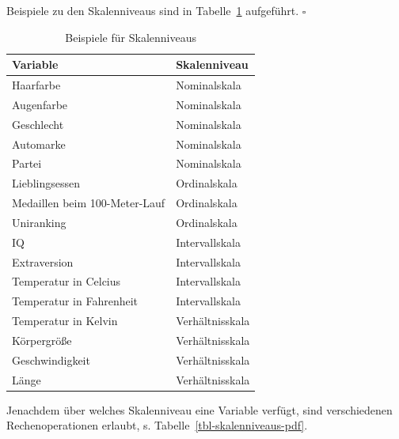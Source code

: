 \documentclass[
  letterpaper,
]{scrbook}
\theoremstyle{definition}
\theoremstyle{definition}
\theoremstyle{definition}
\theoremstyle{remark}
\begin{document}
Beispiele zu den Skalenniveaus sind in Tabelle~\ref{tbl-skalen-bsps}
aufgeführt. \(\square\)

\begin{longtable}[]{@{}ll@{}}

\caption{\label{tbl-skalen-bsps}Beispiele für Skalenniveaus}

\tabularnewline

\toprule\noalign{}
Variable & Skalenniveau \\
\midrule\noalign{}
\endhead
\bottomrule\noalign{}
\endlastfoot
Haarfarbe & Nominalskala \\
Augenfarbe & Nominalskala \\
Geschlecht & Nominalskala \\
Automarke & Nominalskala \\
Partei & Nominalskala \\
Lieblingsessen & Ordinalskala \\
Medaillen beim 100-Meter-Lauf & Ordinalskala \\
Uniranking & Ordinalskala \\
IQ & Intervallskala \\
Extraversion & Intervallskala \\
Temperatur in Celcius & Intervallskala \\
Temperatur in Fahrenheit & Intervallskala \\
Temperatur in Kelvin & Verhältnisskala \\
Körpergröße & Verhältnisskala \\
Geschwindigkeit & Verhältnisskala \\
Länge & Verhältnisskala \\

\end{longtable}

Jenachdem über welches Skalenniveau eine Variable verfügt, sind
verschiedenen Rechenoperationen erlaubt, s.
{Tabelle~\ref{tbl-skalenniveaus-pdf}}.
\end{document}
